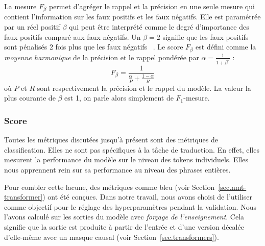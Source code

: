 La mesure \(F_\beta\) permet d'agréger le rappel et la précision en une seule mesure
qui contient l'information sur les faux positifs et les faux négatifs.
Elle est paramétrée par un réel positif \(\beta\) 
qui peut être interprété comme le degré d'importance des faux positifs comparé aux faux négatifs.
Un \(\beta = 2\) signifie que les faux positifs sont pénalisés 2 fois plus que les faux négatifs%
~\cite{books/bu/Rijsbergen79}.
Le score \(F_\beta\) est défini comme la \emph{moyenne harmonique} de la précision et le rappel
pondérée par \(\alpha = \frac{1}{1 + \beta^2}\) :
\begin{equation}
    \label{eq.fbeta}
    F_\beta = \frac{1}{\frac{\alpha}{P} + \frac{1 - \alpha}{R}}
\end{equation}
où \(P\) et \(R\) sont respectivement la précision et le rappel du modèle.
La valeur la plus courante de \(\beta\) est 1,
on parle alors simplement de \(F_1\)-mesure.


\subsubsection{Score }

Toutes les métriques discutées jusqu'à présent sont des métriques de classification.
Elles ne sont pas spécifiques à la tâche de traduction.
En effet, elles mesurent la performance du modèle sur le niveau des tokens individuels.
Elles nous apprennent rein sur sa performance au niveau des phrases entières.

Pour combler cette lacune, des métriques comme \gls{bleu} (voir Section~\ref{sec.nmt-transformer}) ont été conçues.
Dans notre travail, nous avons choisi de l'utiliser comme objectif 
pour le réglage des hyperparamètres pendant la validation.
Nous l'avons calculé sur les sorties du modèle avec \emph{forçage de l'enseignement}.
Cela signifie que la sortie est produite à partir de l'entrée et d'une version décalée 
d'elle-même avec un masque causal (voir Section~\ref{sec.transformers}).


